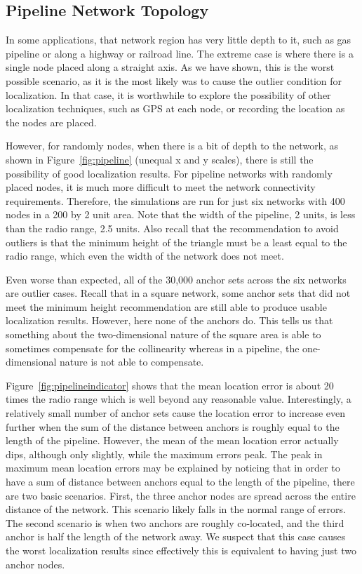 \subsection{Pipeline Network Topology}

In some applications, that network region has very little depth to it, such as gas pipeline or along a highway or railroad line.  The extreme case is where there is a single node placed along a straight axis.  As we have shown, this is the worst possible scenario, as it is the most likely was to cause the outlier condition for localization.  In that case, it is worthwhile to explore the possibility of other localization techniques, such as GPS at each node, or recording the location as the nodes are placed.  

However, for randomly nodes, when there is a bit of depth to the network, as shown in Figure~\ref{fig:pipeline} (unequal x and y scales), there is still the possibility of good localization results.  For pipeline networks with randomly placed nodes, it is much more difficult to meet the network connectivity requirements.  Therefore, the simulations are run for just six networks with 400 nodes in a 200 by 2 unit area.  Note that the width of the pipeline, 2 units, is less than the radio range, 2.5 units.  Also recall that the recommendation to avoid outliers is that the minimum height of the triangle must be a least equal to the radio range, which even the width of the network does not meet. 

Even worse than expected, all of the 30,000 anchor sets across the six networks are outlier cases.  Recall that in a square network, some anchor sets that did not meet the minimum height recommendation are still able to produce usable localization results.  However, here none of the anchors do.  This tells us that something about the two-dimensional nature of the square area is able to sometimes compensate for the collinearity whereas in a pipeline, the one-dimensional nature is not able to compensate.

Figure~\ref{fig:pipelineindicator} shows that the mean location error is about 20 times the radio range which is well beyond any reasonable value. Interestingly, a relatively small number of anchor sets cause the location error to increase even further when the sum of the distance between anchors is roughly equal to the length of the pipeline.  However, the mean of the mean location error actually dips, although only slightly, while the maximum errors peak.  The peak in maximum mean location errors may be explained by noticing that in order to have a sum of distance between anchors equal to the length of the pipeline, there are two basic scenarios.  First, the three anchor nodes are spread across the entire distance of the network.  This scenario likely falls in the normal range of errors.  The second scenario is when two anchors are roughly co-located, and the third anchor is half the length of the network away.  We suspect that this case causes the worst localization results since effectively this is equivalent to having just two anchor nodes.

